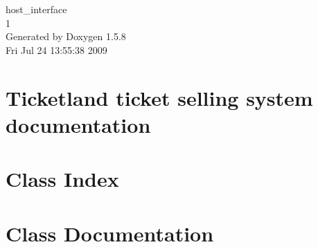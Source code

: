 \documentclass[a4paper]{book}
\begin{document}
\begin{titlepage}
\vspace*{7cm}
\begin{center}
{\Large host\_\-interface \\[1ex]\large 1 }\\
\vspace*{1cm}
{\large Generated by Doxygen 1.5.8}\\
\vspace*{0.5cm}
{\small Fri Jul 24 13:55:38 2009}\\
\end{center}
\end{titlepage}
\clearemptydoublepage
{}
\tableofcontents
\clearemptydoublepage
{}
\chapter{Ticketland ticket selling system documentation}
\label{index}\hypertarget{index}{}
\chapter{Class Index}

\chapter{Class Documentation}




\printindex
\end{document}
